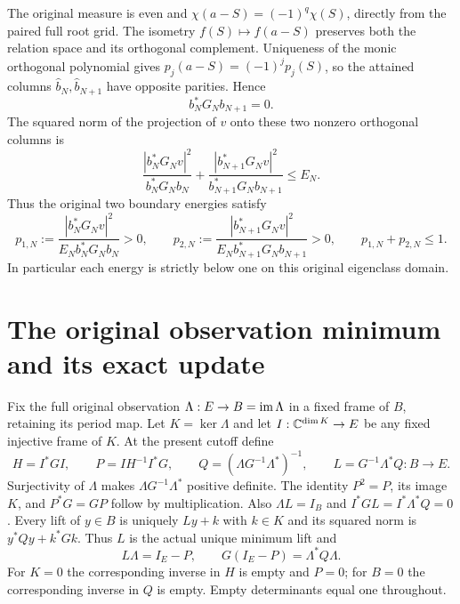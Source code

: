 \documentclass[11pt,a4paper]{article}
\begin{document}
The original measure is even and
$\chi(a-S)=(-1)^q\chi(S)$, directly from the paired full root grid.
The isometry $f(S)\mapsto f(a-S)$ preserves both the relation space
and its orthogonal complement. Uniqueness of the monic orthogonal
polynomial gives $p_j(a-S)=(-1)^jp_j(S)$, so the attained columns
$\widehat b_N,\widehat b_{N+1}$ have opposite parities. Hence
\begin{equation}\label{a04oid:oid:parity}
 b_N^*G_Nb_{N+1}=0.
\end{equation}
The squared norm of the projection of $v$ onto these two nonzero
orthogonal columns is
\[
 \frac{|b_N^*G_Nv|^2}{b_N^*G_Nb_N}
 +\frac{|b_{N+1}^*G_Nv|^2}{b_{N+1}^*G_Nb_{N+1}}\le E_N.
\]
Thus the original two boundary energies satisfy
\begin{equation}\label{a04oid:oid:energies}
 p_{1,N}:=\frac{|b_N^*G_Nv|^2}{E_Nb_N^*G_Nb_N}>0,\qquad
 p_{2,N}:=\frac{|b_{N+1}^*G_Nv|^2}{E_Nb_{N+1}^*G_Nb_{N+1}}>0,
 \qquad p_{1,N}+p_{2,N}\le1.
\end{equation}
In particular each energy is strictly below one on this original
eigenclass domain.

\section{The original observation minimum and its exact update}

Fix the full original observation $\Lambda:E\to B=\operatorname{im}\Lambda$
in a fixed frame of $B$, retaining its period map. Let $K=\ker\Lambda$
and let $I:\mathbb C^{\dim K}\to E$ be any fixed injective frame of $K$.
At the present cutoff define
\begin{equation}\label{a04oid:oid:observation}
 H=I^*GI,\qquad P=IH^{-1}I^*G,\qquad
 Q=(\Lambda G^{-1}\Lambda^*)^{-1},\qquad
 L=G^{-1}\Lambda^*Q:B\to E.
\end{equation}
Surjectivity of $\Lambda$ makes $\Lambda G^{-1}\Lambda^*$
positive definite. The identity $P^2=P$, its image $K$, and
$P^*G=GP$ follow by multiplication. Also $\Lambda L=I_B$ and
$I^*GL=I^*\Lambda^*Q=0$. Every lift of $y\in B$ is uniquely
$Ly+k$ with $k\in K$ and its squared norm is
$y^*Qy+k^*Gk$. Thus $L$ is the actual unique minimum lift and
\begin{equation}\label{a04oid:oid:quotient}
 L\Lambda=I_E-P,\qquad
 G(I_E-P)=\Lambda^*Q\Lambda.
\end{equation}
For $K=0$ the corresponding inverse in $H$ is empty and $P=0$;
for $B=0$ the corresponding inverse in $Q$ is empty. Empty
determinants equal one throughout.
\end{document}
